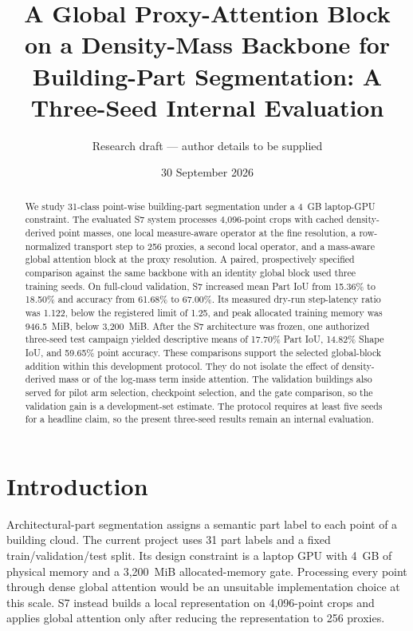 \documentclass[11pt,a4paper]{article}
\title{A Global Proxy-Attention Block on a Density-Mass Backbone for Building-Part Segmentation: A Three-Seed Internal Evaluation}
\author{Research draft --- author details to be supplied}
\date{30 September 2026}
\begin{document}
\maketitle

\begin{abstract}
We study 31-class point-wise building-part segmentation under a 4~GB laptop-GPU constraint. The evaluated S7 system processes 4,096-point crops with cached density-derived point masses, one local measure-aware operator at the fine resolution, a row-normalized transport step to 256 proxies, a second local operator, and a mass-aware global attention block at the proxy resolution. A paired, prospectively specified comparison against the same backbone with an identity global block used three training seeds. On full-cloud validation, S7 increased mean Part IoU from 15.36\% to 18.50\% and accuracy from 61.68\% to 67.00\%. Its measured dry-run step-latency ratio was 1.122, below the registered limit of 1.25, and peak allocated training memory was 946.5~MiB, below 3,200~MiB. After the S7 architecture was frozen, one authorized three-seed test campaign yielded descriptive means of 17.70\% Part IoU, 14.82\% Shape IoU, and 59.65\% point accuracy. These comparisons support the selected global-block addition within this development protocol. They do not isolate the effect of density-derived mass or of the log-mass term inside attention. The validation buildings also served for pilot arm selection, checkpoint selection, and the gate comparison, so the validation gain is a development-set estimate. The protocol requires at least five seeds for a headline claim, so the present three-seed results remain an internal evaluation.
\end{abstract}

\section{Introduction}

Architectural-part segmentation assigns a semantic part label to each point of a building cloud. The current project uses 31 part labels and a fixed train/validation/test split. Its design constraint is a laptop GPU with 4~GB of physical memory and a 3,200~MiB allocated-memory gate. Processing every point through dense global attention would be an unsuitable implementation choice at this scale. S7 instead builds a local representation on 4,096-point crops and applies global attention only after reducing the representation to 256 proxies.
\end{document}
